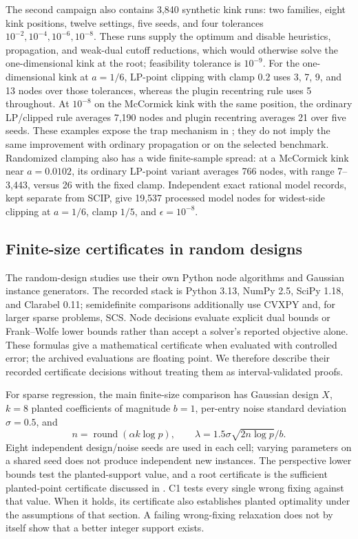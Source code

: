 The second campaign also contains 3,840 synthetic kink runs: two families,
eight kink positions, twelve settings, five seeds, and four tolerances
$10^{-2},10^{-4},10^{-6},10^{-8}$. These runs supply the optimum and disable
heuristics, propagation, and weak-dual cutoff reductions, which would
otherwise solve the one-dimensional kink at the root; feasibility
tolerance is $10^{-9}$. For the
one-dimensional kink at $a=1/6$, LP-point clipping with clamp $0.2$ uses
3, 7, 9, and 13 nodes over those tolerances, whereas the plugin recentring
rule uses 5 throughout. At $10^{-8}$ on the McCormick kink with the same
position, the ordinary LP/clipped rule averages 7,190 nodes and plugin
recentring averages 21 over five seeds. These examples expose the trap
mechanism in ; they do not imply the same improvement
with ordinary propagation or on the selected benchmark. Randomized
clamping also has a wide finite-sample spread: at a McCormick kink near
$a=0.0102$, its ordinary LP-point variant averages 766 nodes, with range
7--3,443, versus 26 with the fixed clamp. Independent exact rational
model records, kept separate from SCIP, give 19,537 processed model nodes for
widest-side clipping at $a=1/6$, clamp $1/5$, and $\epsilon=10^{-8}$.

\subsection{Finite-size certificates in random designs}
\label{experiments:random}

The random-design studies use their own Python node algorithms and
Gaussian instance generators. The recorded stack is Python 3.13, NumPy
2.5, SciPy 1.18, and Clarabel 0.11; semidefinite comparisons additionally
use CVXPY and, for larger sparse problems, SCS. Node decisions evaluate
explicit dual bounds or Frank--Wolfe lower bounds rather than accept a
solver's reported objective alone. These formulas give a mathematical
certificate when evaluated with controlled error; the archived
evaluations are floating point. We therefore describe their recorded
certificate decisions without treating them as interval-validated proofs.

For sparse regression, the main finite-size comparison has Gaussian
design $X$, $k=8$ planted coefficients of magnitude $b=1$, per-entry noise
standard deviation $\sigma=0.5$, and
\[
 n=\operatorname{round}(\alpha k\log p),\qquad
 \lambda=1.5\sigma\sqrt{2n\log p}/b.
\]
Eight independent design/noise seeds are used in each cell; varying
parameters on a shared seed does not produce independent new instances.
The perspective lower bounds test the planted-support value, and a root
certificate is the sufficient planted-point certificate discussed in
. C1 tests every single wrong fixing against that
value. When it holds, its certificate also establishes planted optimality
under the assumptions of that section. A failing wrong-fixing relaxation
does not by itself show that a better integer support exists.

